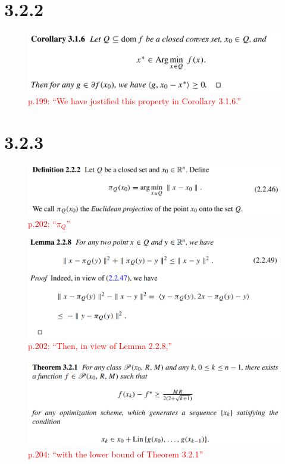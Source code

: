 \documentclass[a4paper, 14pt, dvipdfmx]{extarticle}
\newcommand{\red}[1]{\textcolor{red}{#1}}
\begin{document}
\section*{3.2.2}

\begin{figure}[H]
    \centering
    \includegraphics[width=\columnwidth]{col316.png}
    \caption{\red{p.199: ``We have justified this property in Corollary 3.1.6.''}}
\end{figure}

\section*{3.2.3}

\begin{figure}[H]
    \centering
    \includegraphics[width=\columnwidth]{def222.png}
    \caption{\red{p.202: ``$\pi_Q$''}}
\end{figure}

\begin{figure}[H]
    \centering
    \includegraphics[width=\columnwidth]{lem228.png}
    \caption{\red{p.202: ``Then, in view of Lemma 2.2.8,''}}
\end{figure}

\begin{figure}[H]
    \centering
    \includegraphics[width=\columnwidth]{thm321.png}
    \caption{\red{p.204: ``with the lower bound of Theorem 3.2.1''}}
\end{figure}
\end{document}
